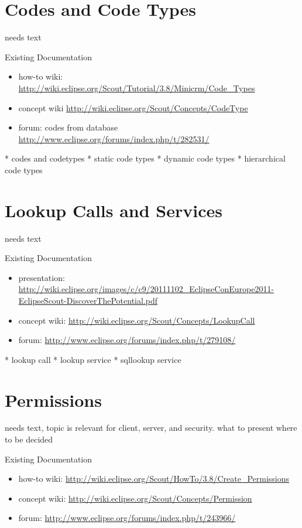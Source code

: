 \documentclass[a4paper,10pt,twoside]{book}
\begin{document}
\section{Codes and Code Types}
needs text

\noindent Existing Documentation
\begin{itemize}
  \item how-to wiki: \url{http://wiki.eclipse.org/Scout/Tutorial/3.8/Minicrm/Code_Types}
  \item concept wiki \url{http://wiki.eclipse.org/Scout/Concepts/CodeType}
  \item forum: codes from database \url{http://www.eclipse.org/forums/index.php/t/282531/}
\end{itemize}

  * codes and codetypes
  * static code types
  * dynamic code types
  * hierarchical code types

\section{Lookup Calls and Services}
needs text
 
\noindent Existing Documentation
\begin{itemize}
  \item presentation: \url{http://wiki.eclipse.org/images/c/c9/20111102_EclipseConEurope2011-EclipseScout-DiscoverThePotential.pdf}
  \item concept wiki: \url{http://wiki.eclipse.org/Scout/Concepts/LookupCall}
  \item forum: \url{http://www.eclipse.org/forums/index.php/t/279108/}
\end{itemize}

  * lookup call
  * lookup service
  * sqllookup service

\section{Permissions}

needs text, topic is relevant for client, server, and security. what to present where to be decided

\noindent Existing Documentation
\begin{itemize}
  \item how-to wiki: \url{http://wiki.eclipse.org/Scout/HowTo/3.8/Create_Permissions}
  \item concept wiki: \url{http://wiki.eclipse.org/Scout/Concepts/Permission}
  \item forum: \url{http://www.eclipse.org/forums/index.php/t/243966/}
\end{itemize}
\end{document}

